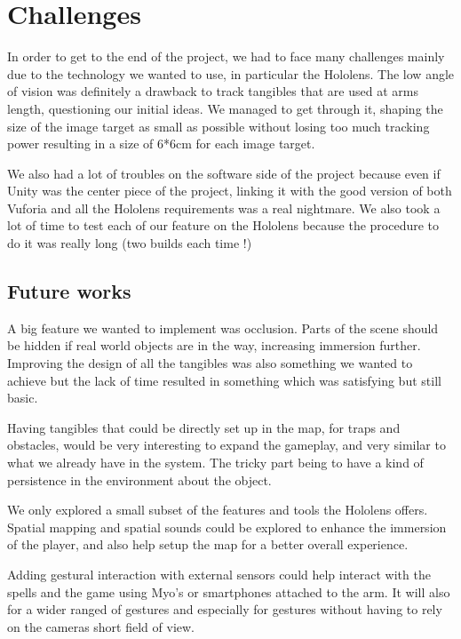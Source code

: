 \documentclass[sigchi, authorversion, screen]{acmart}
\begin{document}
\section{Challenges}

In order to get to the end of the project, we had to face many challenges mainly due to the technology we wanted to use, in particular the Hololens. The low angle of vision was definitely a drawback to track tangibles that are used at arms length, questioning our initial ideas. We managed to get through it, shaping the size of the image target as small as possible without losing too much tracking power resulting in a size of 6*6cm for each image target. 

We also had a lot of troubles on the software side of the project because even if Unity was the center piece of the project, linking it with the good version of both Vuforia and all the Hololens requirements was a real nightmare. We also took a lot of time to test each of our feature on the Hololens because the procedure to do it was really long (two builds each time !)


\subsection{Future works}

A big feature we wanted to implement was occlusion. Parts of the scene should be hidden if real world objects are in the way, increasing immersion further. Improving the design of all the tangibles was also something we wanted to achieve but the lack of time resulted in something which was satisfying but still basic.

Having tangibles that could be directly set up in the map, for traps and obstacles, would be very interesting to expand the gameplay, and very similar to what we already have in the system. The tricky part being to have a kind of persistence in the environment about the object.

We only explored a small subset of the features and tools the Hololens offers. Spatial mapping and spatial sounds could be explored to enhance the immersion of the player, and also help setup the map for a better overall experience. 

Adding gestural interaction with external sensors could help interact with the spells and the game using Myo’s or smartphones attached to the arm. It will also for a wider ranged of gestures and especially for gestures without having to rely on the cameras short field of view.
\end{document}
